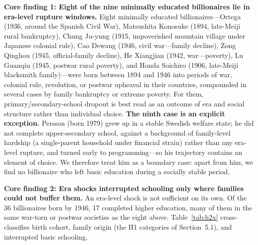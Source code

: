 \documentclass[11pt,a4paper]{article}
\begin{document}
\textbf{Core finding 1: Eight of the nine minimally educated billionaires lie in era-level rupture windows.} Eight minimally educated billionaires---Ortega (1936, around the Spanish Civil War), Matsushita Konosuke (1894, late-Meiji rural bankruptcy), Chung Ju-yung (1915, impoverished mountain village under Japanese colonial rule), Cao Dewang (1946, civil war---family decline), Zong Qinghou (1945, official-family decline), He Xiangjian (1942, war---poverty), Lu Guanqiu (1945, postwar rural poverty), and Honda Soichiro (1906, late-Meiji blacksmith family)---were born between 1894 and 1946 into periods of war, colonial rule, revolution, or postwar upheaval in their countries, compounded in several cases by family bankruptcy or extreme poverty. For them, primary/secondary-school dropout is best read as an outcome of era and social structure rather than individual choice. \textbf{The ninth case is an explicit exception.} Persson (born 1979) grew up in a stable Swedish welfare state; he did not complete upper-secondary school, against a background of family-level hardship (a single-parent household under financial strain) rather than any era-level rupture, and turned early to programming---so his trajectory contains an element of choice. We therefore treat him as a boundary case: apart from him, we find no billionaire who left basic education during a socially stable period.

\textbf{Core finding 2: Era shocks interrupted schooling only where families could not buffer them.} An era-level shock is not sufficient on its own. Of the 36 billionaires born by 1946, 17 completed higher education, many of them in the same war-torn or postwar societies as the eight above. Table~\ref{tab:h2x} cross-classifies birth cohort, family origin (the H1 categories of Section~5.1), and interrupted basic schooling.
\end{document}
